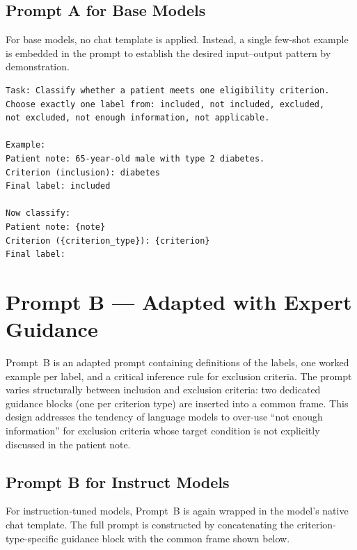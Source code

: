 \subsection{Prompt A for Base Models}

For base models, no chat template is applied. Instead, a single 
few-shot example is embedded in the prompt to establish the desired 
input--output pattern by demonstration.

\begin{lstlisting}[caption={Prompt A for Base models}, 
    label={lst:prompt-a-base}, breaklines=true, basicstyle=\ttfamily\small]
Task: Classify whether a patient meets one eligibility criterion.
Choose exactly one label from: included, not included, excluded,
not excluded, not enough information, not applicable.

Example:
Patient note: 65-year-old male with type 2 diabetes.
Criterion (inclusion): diabetes
Final label: included

Now classify:
Patient note: {note}
Criterion ({criterion_type}): {criterion}
Final label:
\end{lstlisting}

\section{Prompt B --- Adapted with Expert Guidance}
\label{sec:app-prompt-b}

Prompt~B is an adapted prompt containing definitions of the labels, 
one worked example per label, and a critical inference rule for 
exclusion criteria. The prompt varies structurally between inclusion 
and exclusion criteria: two dedicated guidance blocks (one per 
criterion type) are inserted into a common frame. This design 
addresses the tendency of language models to over-use ``not enough 
information'' for exclusion criteria whose target condition is not 
explicitly discussed in the patient note.

\subsection{Prompt B for Instruct Models}

For instruction-tuned models, Prompt~B is again wrapped in the 
model's native chat template. The full prompt is constructed by 
concatenating the criterion-type-specific guidance block with the 
common frame shown below.

